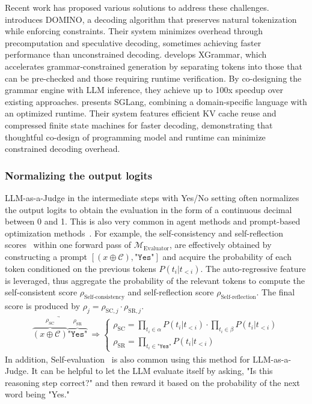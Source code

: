 Recent work has proposed various solutions to address these challenges. \cite{beurer-kellner_guiding_2024} introduces DOMINO, a decoding algorithm that preserves natural tokenization while enforcing constraints. Their system minimizes overhead through precomputation and speculative decoding, sometimes achieving faster performance than unconstrained decoding. \cite{dong_xgrammar_2024} develops XGrammar, which accelerates grammar-constrained generation by separating tokens into those that can be pre-checked and those requiring runtime verification. By co-designing the grammar engine with LLM inference, they achieve up to 100x speedup over existing approaches.\cite{zheng_sglang_2024} presents SGLang, combining a domain-specific language with an optimized runtime. Their system features efficient KV cache reuse and compressed finite state machines for faster decoding, demonstrating that thoughtful co-design of programming model and runtime can minimize constrained decoding overhead.





\subsubsection{\textbf{Normalizing the output logits}}
LLM-as-a-Judge in the intermediate steps with Yes/No setting often normalizes the output logits to obtain the evaluation in the form of a continuous decimal between 0 and 1. This is also very common in agent methods and prompt-based optimization methods~\cite{hao2023reasoning, zhuang2023toolchain, speculative_rag}. For example, the self-consistency and self-reflection scores~\citep{speculative_rag} within one forward pass of $\mathcal{M}_\text{Evaluator}$, are effectively obtained by constructing a prompt $[\left( x \oplus \mathcal{C} \right), \texttt{"Yes"}]$ and acquire the probability of each token conditioned on the previous tokens $P(t_i | t_{<i})$. The auto-regressive feature is leveraged, thus aggregate the probability of the relevant tokens to compute the self-consistent score $\rho_\text{Self-consistency}$ and self-reflection score $\rho_\text{Self-reflection}$. The final score is produced by $\rho_j = \rho_{\text{SC},j} \cdot \rho_{\text{SR},j}$.
\begin{align*}
    \underrightarrow{ \overbrace{\left( x \oplus \mathcal{C} \right)}^{\rho_\text{SC}} 
    \overbrace{\texttt{"Yes"}}^{\rho_\text{SR}}} \  \Rightarrow
    \begin{cases}
    \rho_\text{SC} = \prod_{t_i\in \alpha} P(t_i|t_{<i}) \cdot \prod_{t_i\in \beta} P(t_i|t_{<i})\\ \rho_\text{SR} = \prod_{t_i\in \texttt{"Yes"}} P(t_i|t_{<i})
    \end{cases}
\end{align*}
In addition, Self-evaluation~\citep{hao2023reasoning} is also common using this method for LLM-as-a-Judge. It can be helpful to let the LLM evaluate itself by asking, "Is this reasoning step correct?" and then reward it based on the probability of the next word being "Yes."



